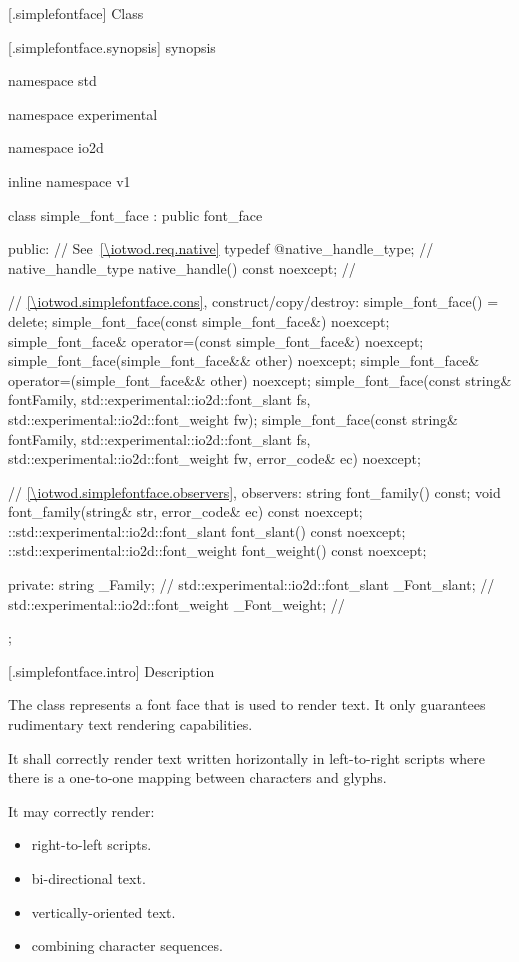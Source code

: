  [\iotwod.simplefontface] {Class }

 [\iotwod.simplefontface.synopsis] { synopsis}

\begin{codeblock}
namespace std { namespace experimental { namespace io2d { inline namespace v1 {
  class simple_font_face : public font_face {
  public:
    // See~\ref{\iotwod.req.native}
    typedef @\impdef@ native_handle_type; // \expos
    native_handle_type native_handle() const noexcept; // \expos
    
    // \ref{\iotwod.simplefontface.cons}, construct/copy/destroy:
    simple_font_face() = delete;
    simple_font_face(const simple_font_face&) noexcept;
    simple_font_face& operator=(const simple_font_face&) noexcept;
    simple_font_face(simple_font_face&& other) noexcept;
    simple_font_face& operator=(simple_font_face&& other) noexcept;
    simple_font_face(const string& fontFamily,
      std::experimental::io2d::font_slant fs,
      std::experimental::io2d::font_weight fw);
    simple_font_face(const string& fontFamily,
      std::experimental::io2d::font_slant fs,
      std::experimental::io2d::font_weight fw, error_code& ec) noexcept;

    // \ref{\iotwod.simplefontface.observers}, observers:
    string font_family() const;
    void font_family(string& str, error_code& ec) const noexcept;
    ::std::experimental::io2d::font_slant font_slant() const noexcept;
    ::std::experimental::io2d::font_weight font_weight() const noexcept;

  private:
    string _Family;                                    // \expos
    std::experimental::io2d::font_slant _Font_slant;   // \expos
    std::experimental::io2d::font_weight _Font_weight; // \expos
  };
} } } }
\end{codeblock}

 [\iotwod.simplefontface.intro] { Description}

\pnum
{}
The  class represents a font face that is used to render text. It only guarantees rudimentary text rendering capabilities.

\pnum
It shall correctly render text written horizontally in left-to-right scripts where there is a one-to-one mapping between characters and glyphs.

\pnum
It may correctly render:
\begin{itemize}
	\item right-to-left scripts.
	\item bi-directional text.
	\item vertically-oriented text.
	\item combining character sequences.
\end{itemize}

